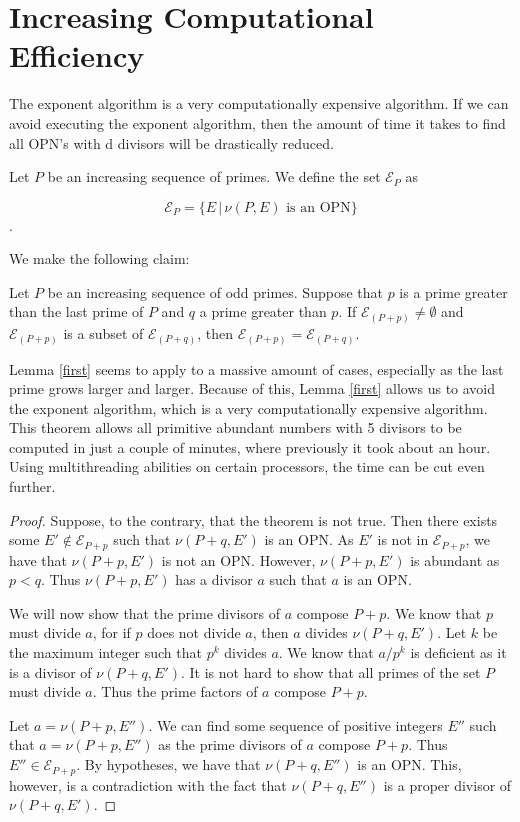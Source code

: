 \documentclass[../paper.tex]{subfiles}
\begin{document}
\section{Increasing Computational Efficiency}

The exponent algorithm is a very computationally expensive
algorithm. If we can avoid executing the exponent algorithm, then
the amount of time it takes to find all OPN's with d divisors will
be drastically reduced. 

Let $P$ be an increasing sequence of primes. We define the set
$\mathcal{E}_P$ as 

$$\mathcal{E}_P = \{E\, |\, \nu(P, E) \text{ is an OPN}\}$$.

We make the following claim:

\begin{lem}\label{first}
Let $P$ be an increasing sequence of odd primes. Suppose
that $p$ is a prime greater than the last prime of $P$ and $q$ a
prime greater than $p$. If $\mathcal{E}_{(P + p)} \neq 
\emptyset$ and $\mathcal{E}_{(P + p)}$ is a subset of 
$\mathcal{E}_{(P + q)}$, then $\mathcal{E}_{(P + p)} = 
\mathcal{E}_{(P + q)}$.
\end{lem}

Lemma {\ref{first}} seems to apply to a massive amount of cases,
especially as the last prime grows larger and larger. Because of
this, Lemma {\ref{first}} allows us to avoid the exponent algorithm,
which is a very computationally expensive algorithm. This theorem
allows all primitive abundant numbers with 5 divisors to be
computed in just a couple of minutes, where previously it took
about an hour. Using multithreading abilities on certain
processors, the time can be cut even further.


\begin{proof}
  Suppose, to the contrary, that the theorem is not true. Then
there exists some $E' \notin \mathcal{E}_{P + p}$ such that $\nu
(P + q, E')$ is an OPN. As $E'$ is not in $\mathcal{E}_{P + p}$,
we have that $\nu (P + p, E')$ is not an OPN. However, $\nu (P +
p, E')$ is abundant as $p < q$. Thus $\nu (P + p, E')$ has a
divisor $a$ such that $a$ is an OPN. 

  We will now show that the prime divisors of $a$ compose $P + p$.
We know that $p$ must divide $a$, for if $p$ does not divide $a$,
then $a$ divides $\nu (P + q, E')$. Let $k$ be the maximum
integer such that $p^k$ divides $a$. We know that $a / p^k$ is
deficient as it is a divisor of $\nu (P + q, E')$. It is not hard
to show that all primes of the set $P$ must divide $a$. Thus the
prime factors of $a$ compose $P + p$. 

  Let $a = \nu(P + p, E'')$. We can find some sequence of positive
integers $E''$ such that $a = \nu (P + p, E'')$ as the prime divisors
of $a$ compose $P + p$. Thus $E'' \in \mathcal{E}_{P + p}$. By
hypotheses, we have that $\nu(P + q, E'')$ is an OPN. This,
however, is a contradiction with the fact that $\nu(P + q, E'')$
is a proper divisor of $\nu(P + q, E')$.
\end{proof}
\end{document}
